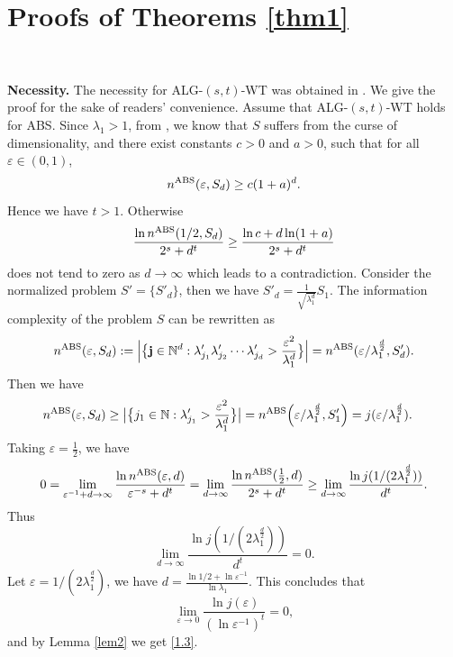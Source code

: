 \documentclass{amsart}
\numberwithin{equation}{section}
\def\vz{\varepsilon}
\def\lz{\lambda}
\newcommand{\NN}{\mathbb{N}}
\newcommand{\bsj}{\oldsymbol{j}}
\def\NN{{\mathbb N}}
\def\bsj{{\bf j}}
\begin{document}
\section{Proofs of Theorems \ref{thm1}}

\


 {\bf Necessity.} The necessity for ALG-$(s,t)$-WT was obtained in \cite{SW15}. We give the proof for
 the sake of readers' convenience.  Assume that ALG-$(s,t)$-WT holds for ABS. Since $\lz_1>1$,
 from \cite[Theorem 5.5]{NW08}, we know that $S$ suffers from the curse of
dimensionality, and   there exist  constants $c>0$ and $a>0$, such
that for all $\vz\in(0,1)$,
$$n^{\rm ABS}(\vz, S_d)\ge c(1+a)^d.$$
Hence we have $t>1$. Otherwise
$$\frac{\ln n^{\rm ABS}(1/2,S_d)}{2^s+d^t}\ge \frac{\ln c+d\ln(1+a)}{2^s+d^t}$$
does not tend to zero as $d\to\infty$ which leads to a
contradiction. Consider the normalized problem $S'=\{S'_d\}$, then
we have $S'_d=\frac{1}{\sqrt{\lambda^d_1}}S_1$. The information
complexity of the problem $S$ can be rewritten as
 $$n^{\rm ABS}(\vz,S_d):= \Big|\big\{\bsj \in \NN^d : \lambda'_{j_1} \lambda'_{j_2}\cdots
 \lambda'_{j_d}> \frac{\varepsilon^2}{\lz_1^d}  \big\}\Big|=n^{\rm ABS }(\vz/\lambda_1^\frac{d}{2},S'_d).$$
Then we have
 \begin{align*}
 n^{\rm ABS}(\vz,S_d)&\ge \big|\big\{j_1 \in \NN : \lambda'_{j_1}> \frac{\varepsilon^2}{\lz_1^d} \big\}\big|= n^{\rm ABS}\Big(\vz/\lambda_1^{\frac{d}{2}},S'_1\Big)=j(\vz/\lambda_1^{\frac{d}{2}}).
 \end{align*}
 Taking $\vz=\frac{1}{2}$, we have
 $$0=\lim_{\vz^{-1}+d\to \infty}\frac{\ln n^{\rm ABS}(\vz,d)}{\vz^{-s}+d^t}=\lim_{d\to \infty}\frac{\ln n^{\rm ABS}(\frac{1}{2},d)}{2^s+d^t}\ge \lim_{d\to \infty}\frac{\ln j(1/(2\lambda_1^{\frac{d}{2}}))}{d^t}.$$
 Thus
 $$\lim_{d\to \infty}\frac{\ln j(1/(2\lambda_1^{\frac{d}{2}}))}{d^t}=0.$$
  Let $\vz=1/(2\lambda_1^{\frac{d}{2}})$, we have $d=\frac{\ln1/2+\ln\vz^{-1}}{\ln \lz_1}$.
This
 concludes that
$$\lim_{\vz\to 0}\frac{\ln j(\vz)}{(\ln \vz^{-1})^t}=0,$$and by Lemma
\ref{lem2} we get \eqref{1.3}.
\end{document}
